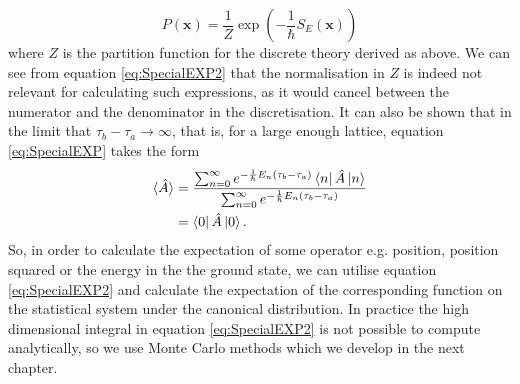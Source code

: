 \documentclass[12pt]{article}
\begin{document}
        \begin{equation}
            P\left(\bm{x}\right) = \frac{1}{Z}\exp{\left(-\frac{1}{\hbar}S_{E}\left(\bm{x}\right)\right)}
        \end{equation}
        where $Z$ is the partition function for the discrete theory derived as above. We can see from equation \ref{eq:SpecialEXP2} that the normalisation in $Z$ is indeed not relevant for calculating such expressions, as it would cancel between the numerator and the denominator in the discretisation. It can also be shown that in the limit that $\tau_b - \tau_a \rightarrow \infty$, that is, for a large enough lattice, equation \ref{eq:SpecialEXP} takes the form \cite{creutz_freedman_1981}
        \begin{align}
            \label{eq:LargeLatticeExpectation1} \braket{\hat{A}} & = \frac{\sum_{n=0}^{\infty}e^{-\frac{1}{\hbar}E_n\left(\tau_b-\tau_a\right)}\bra{n}\hat{A}\ket{n}}{\sum_{n=0}^{\infty}e^{-\frac{1}{\hbar}E_n\left(\tau_b-\tau_a\right)}} \\
            \label{eq:LargeLatticeExpectation2}& = \bra{0}\hat{A}\ket{0}.
        \end{align}
        So, in order to calculate the expectation of some operator e.g. position, position squared or the energy in the the ground state, we can utilise equation \ref{eq:SpecialEXP2} and calculate the expectation of the corresponding function on the statistical system under the canonical distribution.  In practice the high dimensional integral in equation \ref{eq:SpecialEXP2} is not possible to compute analytically, so we use Monte Carlo methods which we develop in the next chapter.
\end{document}
